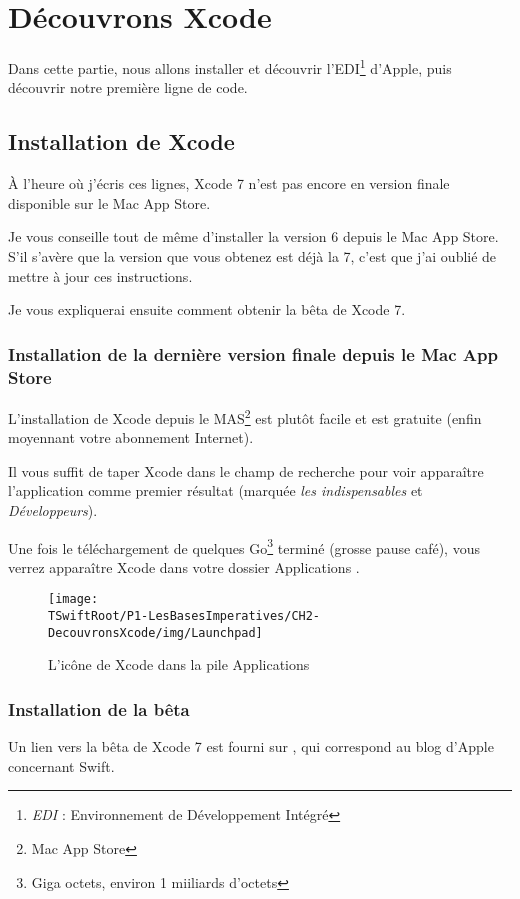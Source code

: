 \chapter{Découvrons Xcode}
Dans cette partie, nous allons installer et découvrir l'EDI\footnote{\emph{EDI} : Environnement de Développement Intégré} d’Apple,
puis découvrir notre première ligne de code.
\section{Installation de Xcode}
À l'heure où j'écris ces lignes, Xcode 7 n'est pas encore en version finale disponible sur le Mac App Store.

Je vous conseille tout de même d'installer la version 6 depuis le Mac App Store. S'il s'avère que la version que vous obtenez est déjà la 7, c'est que j'ai oublié de mettre à jour ces instructions.

Je vous expliquerai ensuite comment obtenir la bêta de Xcode 7.

\subsection{Installation de la dernière version finale depuis le Mac App Store}
L'installation de Xcode depuis le MAS\footnote{Mac App Store} est plutôt facile et est gratuite (enfin moyennant votre abonnement Internet).

Il vous suffit de taper Xcode dans le champ de recherche pour voir apparaître l'application comme premier résultat (marquée \emph{les indispensables} et \emph{Développeurs}).

Une fois le téléchargement de quelques Go\footnote{Giga octets, environ 1 miiliards d'octets} terminé
(grosse pause café),
vous verrez apparaître Xcode dans votre dossier \og Applications \fg{}.
\begin{figure}[H]
\centering
\texttt{[image: \\TSwiftRoot/P1-LesBasesImperatives/CH2-DecouvronsXcode/img/Launchpad]}
\caption{L'icône de Xcode dans la pile \og Applications \fg{}}
\end{figure}

\subsection{Installation de la bêta}
Un lien vers la bêta de Xcode 7 est fourni sur , qui correspond au blog d'Apple concernant Swift.

